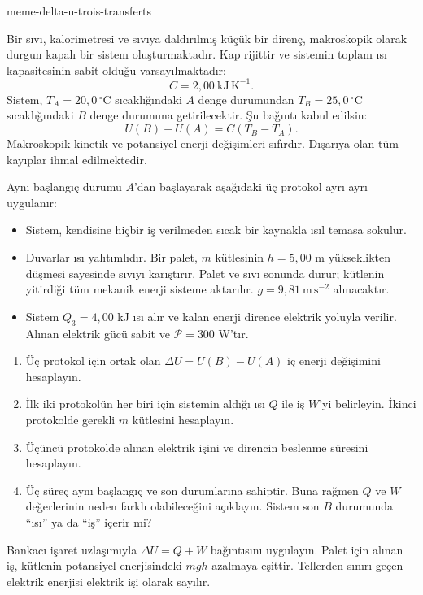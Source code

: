 \begin{exo}{meme-delta-u-trois-transferts}

Bir sıvı, kalorimetresi ve sıvıya daldırılmış küçük bir direnç, makroskopik
olarak durgun kapalı bir sistem oluşturmaktadır. Kap rijittir ve sistemin toplam
ısı kapasitesinin sabit olduğu varsayılmaktadır:
\[
C=2{,}00\ \mathrm{kJ\,K^{-1}}.
\]
Sistem, $T_A=20{,}0\,^\circ\mathrm{C}$ sıcaklığındaki $A$ denge durumundan
$T_B=25{,}0\,^\circ\mathrm{C}$ sıcaklığındaki $B$ denge durumuna getirilecektir.
Şu bağıntı kabul edilsin:
\[
U(B)-U(A)=C(T_B-T_A).
\]
Makroskopik kinetik ve potansiyel enerji değişimleri sıfırdır. Dışarıya olan
tüm kayıplar ihmal edilmektedir.

Aynı başlangıç durumu $A$'dan başlayarak aşağıdaki üç protokol ayrı ayrı uygulanır:
\begin{itemize}
\item[Protokol 1] Sistem, kendisine hiçbir iş verilmeden sıcak bir kaynakla ısıl temasa sokulur.
\item[Protokol 2] Duvarlar ısı yalıtımlıdır. Bir palet, $m$ kütlesinin $h=5{,}00$ m yükseklikten düşmesi sayesinde sıvıyı karıştırır. Palet ve sıvı sonunda durur; kütlenin yitirdiği tüm mekanik enerji sisteme aktarılır. $g=9{,}81\ \mathrm{m\,s^{-2}}$ alınacaktır.
\item[Protokol 3] Sistem $Q_3=4{,}00$ kJ ısı alır ve kalan enerji dirence elektrik yoluyla verilir. Alınan elektrik gücü sabit ve $\mathcal P=300$ W'tır.
\end{itemize}

\begin{enumerate}
\item Üç protokol için ortak olan $\Delta U=U(B)-U(A)$ iç enerji değişimini hesaplayın.
\item İlk iki protokolün her biri için sistemin aldığı ısı $Q$ ile iş $W$'yi belirleyin. İkinci protokolde gerekli $m$ kütlesini hesaplayın.
\item Üçüncü protokolde alınan elektrik işini ve direncin beslenme süresini hesaplayın.
\item Üç süreç aynı başlangıç ve son durumlarına sahiptir. Buna rağmen $Q$ ve $W$ değerlerinin neden farklı olabileceğini açıklayın. Sistem son $B$ durumunda “ısı” ya da “iş” içerir mi?
\end{enumerate}

\begin{indication}
Bankacı işaret uzlaşımıyla $\Delta U=Q+W$ bağıntısını uygulayın. Palet için
alınan iş, kütlenin potansiyel enerjisindeki $mgh$ azalmaya eşittir. Tellerden
sınırı geçen elektrik enerjisi elektrik işi olarak sayılır.
\end{indication}


\end{exo}
